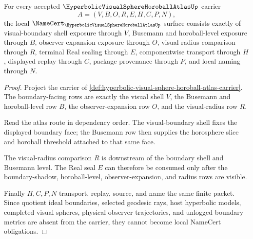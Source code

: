 \begin{theorem}
\label{thm:hyperbolic-visual-sphere-horoball-atlas-namecert-obligations}
For every accepted $\HyperbolicVisualSphereHoroballAtlasUp$ carrier
$$
A=(V,B,O,R,E,H,C,P,N),
$$
the local $\NameCert_{\HyperbolicVisualSphereHoroballAtlasUp}$ surface consists exactly of visual-boundary shell exposure through $V$, Busemann and horoball-level exposure through $B$, observer-expansion exposure through $O$, visual-radius comparison through $R$, terminal Real sealing through $E$, componentwise transport through $H$, displayed replay through $C$, package provenance through $P$, and local naming through $N$.
\end{theorem}
\begin{proof}
Project the carrier of \autoref{def:hyperbolic-visual-sphere-horoball-atlas-carrier}. The boundary-facing rows are exactly the visual shell $V$, the Busemann and horoball-level row $B$, the observer-expansion row $O$, and the visual-radius row $R$.

Read the atlas route in dependency order. The visual-boundary shell fixes the displayed boundary face; the Busemann row then supplies the horosphere slice and horoball threshold attached to that same face.

The visual-radius comparison $R$ is downstream of the boundary shell and Busemann level. The Real seal $E$ can therefore be consumed only after the boundary-shadow, horoball-level, observer-expansion, and radius rows are visible.

Finally $H,C,P,N$ transport, replay, source, and name the same finite packet. Since quotient ideal boundaries, selected geodesic rays, host hyperbolic models, completed visual spheres, physical observer trajectories, and unlogged boundary metrics are absent from the carrier, they cannot become local NameCert obligations.
\end{proof}



